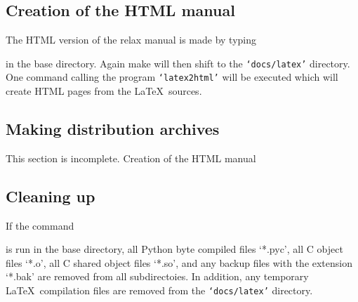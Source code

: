 \subsection{Creation of the HTML manual}

The HTML version of the relax manual is made by typing


in the base directory.  Again make will then shift to the \texttt{`docs/latex'} directory.  One command calling the program \texttt{`latex2html'} will be executed which will create HTML pages from the \LaTeX\ sources.


\subsection{Making distribution archives}

This section is incomplete.
Creation of the HTML manual


\subsection{Cleaning up}

If the command


is run in the base directory, all Python byte compiled files `*.pyc', all C object files `*.o', all C shared object files `*.so', and any backup files with the extension `*.bak' are removed from all subdirectoies.  In addition, any temporary \LaTeX\ compilation files are removed from the \texttt{`docs/latex'} directory.
